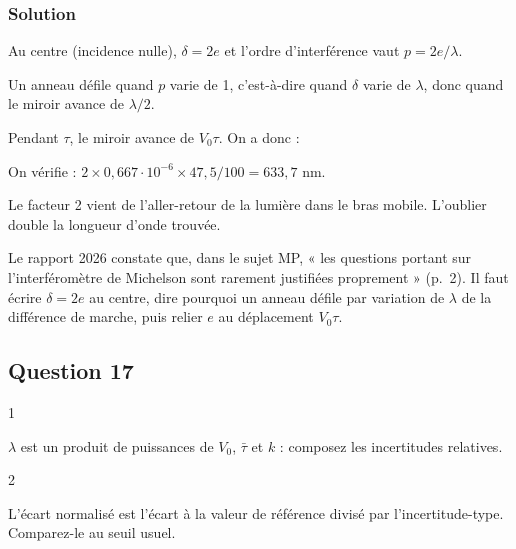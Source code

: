 \documentclass[11pt,a4paper]{article}
\newcommand{\equationajustee}[1]{%
  \sbox{\boiteequation}{$\displaystyle #1$}%
  \ifdim\wd\boiteequation>\linewidth
    \[\resizebox{\linewidth}{!}{\usebox{\boiteequation}}\]%
  \else
    \[#1\]%
  \fi}
\begin{document}
\hypertarget{solution-15}{%
\subsubsection{Solution}\label{solution-15}}

Au centre (incidence nulle), \(\delta=2e\) et l'ordre d'interférence vaut \(p=2e/\lambda\).

Un anneau défile quand \(p\) varie de 1, c'est-à-dire quand \(\delta\) varie de \(\lambda\), donc quand le miroir avance de \(\lambda/2\).

Pendant \(\tau\), le miroir avance de \(V_0\tau\). On a donc :

\equationajustee{2V_0\tau=k\lambda}

\equationajustee{\boxed{\lambda=\frac{2V_0\tau}{k}}}

On vérifie : \(2\times0{,}667\cdot10^{-6}\times47{,}5/100=633{,}7\) nm.

\begin{piege}

Le facteur 2 vient de l'aller-retour de la lumière dans le bras mobile. L'oublier double la longueur d'onde trouvée.

\end{piege}

\begin{jury}

Le rapport 2026 constate que, dans le sujet MP, « les questions portant sur l'interféromètre de Michelson sont rarement justifiées proprement » (p.~2). Il faut écrire \(\delta=2e\) au centre, dire pourquoi un anneau défile par variation de \(\lambda\) de la différence de marche, puis relier \(e\) au déplacement \(V_0\tau\).

\end{jury}

\hypertarget{question-17}{%
\subsection{Question 17}\label{question-17}}

\begin{indication}{1}

\(\lambda\) est un produit de puissances de \(V_0\), \(\bar\tau\) et \(k\) : composez les incertitudes relatives.

\end{indication}

\begin{indication}{2}

L'écart normalisé est l'écart à la valeur de référence divisé par l'incertitude-type. Comparez-le au seuil usuel.

\end{indication}
\end{document}
